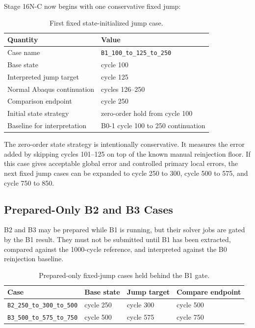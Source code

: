 \documentclass[11pt,a4paper]{article}
\newcommand{\code}[1]{\texttt{#1}}
\begin{document}
Stage 16N-C now begins with one conservative fixed jump:

\begin{table}[H]
\centering
\caption{First fixed state-initialized jump case.}
\begin{tabular}{ll}
\toprule
Quantity & Value \\
\midrule
Case name & \code{B1\_100\_to\_125\_to\_250} \\
Base state & cycle 100 \\
Interpreted jump target & cycle 125 \\
Normal Abaqus continuation & cycles 126--250 \\
Comparison endpoint & cycle 250 \\
Initial state strategy & zero-order hold from cycle 100 \\
Baseline for interpretation & B0-1 cycle 100 to 250 continuation \\
\bottomrule
\end{tabular}
\end{table}

The zero-order state strategy is intentionally conservative. It measures the error added by skipping cycles 101--125 on top of the known manual reinjection floor. If this case gives acceptable global error and controlled primary local errors, the next fixed jump cases can be expanded to cycle 250 to 300, cycle 500 to 575, and cycle 750 to 850.

\subsection{Prepared-Only B2 and B3 Cases}

B2 and B3 may be prepared while B1 is running, but their solver jobs are gated by the B1 result. They must not be submitted until B1 has been extracted, compared against the 1000-cycle reference, and interpreted against the B0 reinjection baseline.

\begin{table}[H]
\centering
\caption{Prepared-only fixed-jump cases held behind the B1 gate.}
\begin{tabular}{llll}
\toprule
Case & Base state & Jump target & Compare endpoint \\
\midrule
\code{B2\_250\_to\_300\_to\_500} & cycle 250 & cycle 300 & cycle 500 \\
\code{B3\_500\_to\_575\_to\_750} & cycle 500 & cycle 575 & cycle 750 \\
\bottomrule
\end{tabular}
\end{table}
\end{document}
